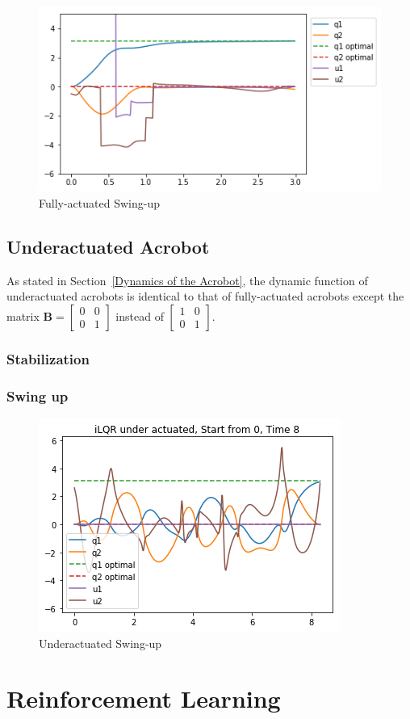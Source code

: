 \begin{figure}[H]
\begin{center}
\includegraphics[width=0.8\linewidth]{full_swingup.png}
\caption[caption]{Fully-actuated Swing-up}
\label{fig:full_swingup}
\end{center}
\end{figure}

\subsection{Underactuated Acrobot}
\quad As stated in Section~\ref{Dynamics of the Acrobot}, the dynamic function of underactuated acrobots is identical to that of fully-actuated acrobots except the matrix $\mathbf B = \begin{bmatrix} 0 & 0 \\ 0 & 1 \end{bmatrix}$ instead of $\begin{bmatrix} 1 & 0 \\ 0 & 1\end{bmatrix}$. 
\subsubsection{Stabilization}
\subsubsection{Swing up}
\begin{figure}[H]
\begin{center}
\includegraphics[width=0.6\linewidth]{under_swingup.png}
\caption[caption]{Underactuated Swing-up}
\label{fig:under_swingup}
\end{center}
\end{figure}
\section{Reinforcement Learning} \label{rf}

\newpage
\medskip

\printbibliography
